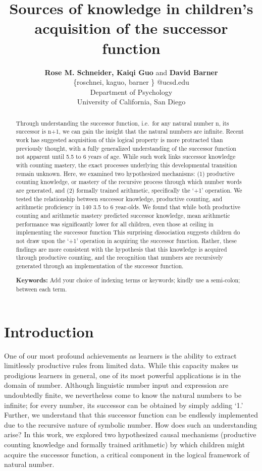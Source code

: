 \documentclass[10pt, letterpaper]{article}
\title{Sources of knowledge in children's acquisition of the successor function}
\author{{\large \bf Rose M. Schneider, Kaiqi Guo} and {\large \bf David Barner} \\ \{roschnei, kaguo, barner \} @ucsd.edu \\ Department of Psychology \\ University of California, San Diego}
\begin{document}
\maketitle

\begin{abstract}
Through understanding the successor function, i.e.~for any natural
number n, its successor is n+1, we can gain the insight that the natural
numbers are infinite. Recent work has suggested acquisition of this
logical property is more protracted than previously thought, with a
fully generalized understanding of the successor function not apparent
until 5.5 to 6 years of age. While such work links successor knowledge
with counting mastery, the exact processes underlying this developmental
transition remain unknown. Here, we examined two hypothesized
mechanisms: (1) productive counting knowledge, or mastery of the
recursive process through which number words are generated, and (2)
formally trained arithmetic, specifically the `+1' operation. We tested
the relationship between successor knowledge, productive counting, and
arithmetic proficiency in 140 3.5 to 6 year-olds. We found that while
both productive counting and arithmetic mastery predicted successor
knowledge, mean arithmetic performance was significantly lower for all
children, even those at ceiling in implementing the successor function
This surprising dissociation suggests children do not draw upon the `+1'
operation in acquiring the successor function. Rather, these findings
are more consistent with the hypothesis that this knowledge is acquired
through productive counting, and the recognition that numbers are
recursively generated through an implementation of the successor
function.

\textbf{Keywords:}
Add your choice of indexing terms or keywords; kindly use a semi-colon;
between each term.
\end{abstract}

\section{Introduction}\label{introduction}

One of our most profound achievements as learners is the ability to
extract limitlessly productive rules from limited data. While this
capacity makes us prodigious learners in general, one of its most
powerful applications is in the domain of number. Although linguistic
number input and expression are undoubtedly finite, we nevertheless come
to know the natural numbers to be infinite; for every number, its
successor can be obtained by simply adding `1.' Further, we understand
that this successor function can be endlessly implemented due to the
recursive nature of symbolic number. How does such an understanding
arise? In this work, we explored two hypothesized causal mechanisms
(productive counting knowledge and formally trained arithmetic) by which
children might acquire the successor function, a critical component in
the logical framework of natural number.
\end{document}
